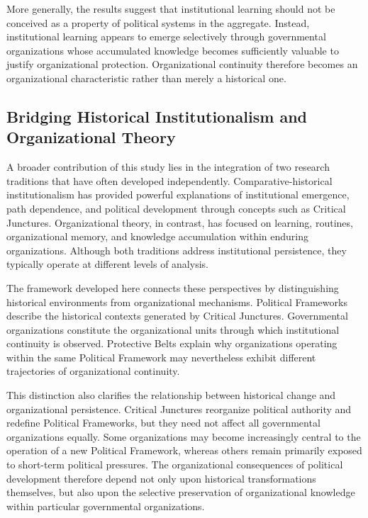 \documentclass[doc, 12pt, a4paper,floatsintext]{apa7}
\begin{document}
More generally, the results suggest that institutional learning should not be conceived as a property of political systems in the aggregate. Instead, institutional learning appears to emerge selectively through governmental organizations whose accumulated knowledge becomes sufficiently valuable to justify organizational protection. Organizational continuity therefore becomes an organizational characteristic rather than merely a historical one.

\subsection{Bridging Historical Institutionalism and Organizational Theory}

A broader contribution of this study lies in the integration of two research traditions that have often developed independently. Comparative-historical institutionalism has provided powerful explanations of institutional emergence, path dependence, and political development through concepts such as Critical Junctures. Organizational theory, in contrast, has focused on learning, routines, organizational memory, and knowledge accumulation within enduring organizations. Although both traditions address institutional persistence, they typically operate at different levels of analysis.

The framework developed here connects these perspectives by distinguishing historical environments from organizational mechanisms. Political Frameworks describe the historical contexts generated by Critical Junctures. Governmental organizations constitute the organizational units through which institutional continuity is observed. Protective Belts explain why organizations operating within the same Political Framework may nevertheless exhibit different trajectories of organizational continuity.

This distinction also clarifies the relationship between historical change and organizational persistence. Critical Junctures reorganize political authority and redefine Political Frameworks, but they need not affect all governmental organizations equally. Some organizations may become increasingly central to the operation of a new Political Framework, whereas others remain primarily exposed to short-term political pressures. The organizational consequences of political development therefore depend not only upon historical transformations themselves, but also upon the selective preservation of organizational knowledge within particular governmental organizations.
\end{document}
